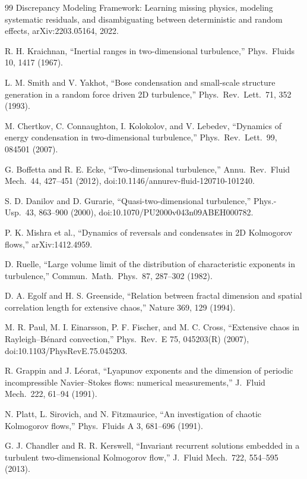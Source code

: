 \documentclass[11pt]{article}
\begin{document}
\begin{thebibliography}{99}
 Discrepancy Modeling Framework:
Learning missing physics, modeling systematic residuals, and
disambiguating between deterministic and random effects,
arXiv:2203.05164, 2022.

 R. H. Kraichnan, ``Inertial ranges in
two-dimensional turbulence,'' Phys.\ Fluids 10, 1417 (1967).

 L. M. Smith and V. Yakhot, ``Bose condensation
and small-scale structure generation in a random force driven 2D
turbulence,'' Phys.\ Rev.\ Lett.\ 71, 352 (1993).

 M. Chertkov, C. Connaughton, I. Kolokolov, and
V. Lebedev, ``Dynamics of energy condensation in two-dimensional
turbulence,'' Phys.\ Rev.\ Lett.\ 99, 084501 (2007).

 G. Boffetta and R. E. Ecke,
``Two-dimensional turbulence,'' Annu.\ Rev.\ Fluid Mech.\ 44, 427--451
(2012), doi:10.1146/annurev-fluid-120710-101240.

 S. D. Danilov and D. Gurarie,
``Quasi-two-dimensional turbulence,'' Phys.-Usp.\ 43, 863--900 (2000),
doi:10.1070/PU2000v043n09ABEH000782.

 P. K. Mishra et al., ``Dynamics of reversals and
condensates in 2D Kolmogorov flows,'' arXiv:1412.4959.

 D. Ruelle, ``Large volume limit of the distribution
of characteristic exponents in turbulence,'' Commun.\ Math.\ Phys.\ 87,
287--302 (1982).

 D. A. Egolf and H. S. Greenside, ``Relation
between fractal dimension and spatial correlation length for extensive
chaos,'' Nature 369, 129 (1994).

 M. R. Paul, M. I. Einarsson, P. F. Fischer, and M. C.
Cross, ``Extensive chaos in Rayleigh--B\'enard convection,'' Phys.\ Rev.\
E 75, 045203(R) (2007), doi:10.1103/PhysRevE.75.045203.

 R. Grappin and J. L\'eorat, ``Lyapunov
exponents and the dimension of periodic incompressible Navier--Stokes
flows: numerical measurements,'' J.\ Fluid Mech.\ 222, 61--94 (1991).

 N. Platt, L. Sirovich, and N. Fitzmaurice,
``An investigation of chaotic Kolmogorov flows,'' Phys.\ Fluids A 3,
681--696 (1991).

 G. J. Chandler and R. R. Kerswell,
``Invariant recurrent solutions embedded in a turbulent two-dimensional
Kolmogorov flow,'' J.\ Fluid Mech.\ 722, 554--595 (2013).


\end{thebibliography}
\end{document}
